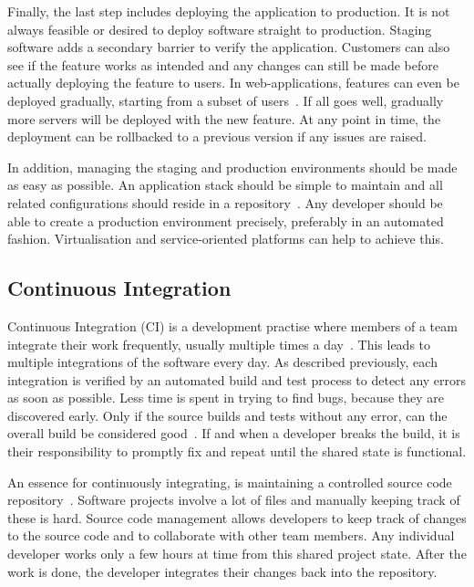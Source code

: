 \documentclass[english]{tktltiki2}
\begin{document}
Finally, the last step includes deploying the application to production. It is not always feasible or desired to deploy software straight to production. Staging software adds a secondary barrier to verify the application. Customers can also see if the feature works as intended and any changes can still be made before actually deploying the feature to users. In web-applications, features can even be deployed gradually, starting from a subset of users~\cite{Bos12}. If all goes well, gradually more servers will be deployed with the new feature. At any point in time, the deployment can be rollbacked to a previous version if any issues are raised.

In addition, managing the staging and production environments should be made as easy as possible. An application stack should be simple to maintain and all related configurations should reside in a repository~\cite{HF11}. Any developer should be able to create a production environment precisely, preferably in an automated fashion. Virtualisation and service-oriented platforms can help to achieve this.

\subsection{Continuous Integration}

Continuous Integration (CI) is a development practise where members of a team integrate their work frequently, usually multiple times a day~\cite{Fow06}. This leads to multiple integrations of the software every day. As described previously, each integration is verified by an automated build and test process to detect any errors as soon as possible. Less time is spent in trying to find bugs, because they are discovered early. Only if the source builds and tests without any error, can the overall build be considered good~\cite{Fow06}. If and when a developer breaks the build, it is their responsibility to promptly fix and repeat until the shared state is functional.

An essence for continuously integrating, is maintaining a controlled source code repository~\cite{Fow06}. Software projects involve a lot of files and manually keeping track of these is hard. Source code management allows developers to keep track of changes to the source code and to collaborate with other team members. Any individual developer works only a few hours at time from this shared project state. After the work is done, the developer integrates their changes back into the repository.
\end{document}
